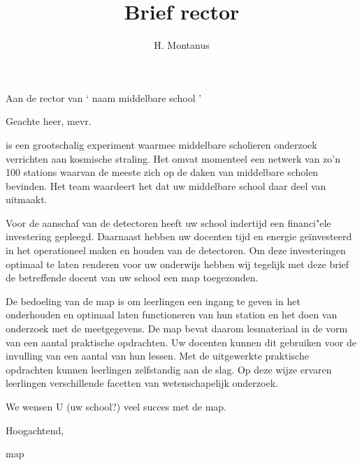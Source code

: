




\title{Brief rector}
\author{H. Montanus}
\date{}

\maketitle
 
Aan de rector van ` naam middelbare school ' 

Geachte heer, mevr. 

\hisparc is een grootschalig experiment waarmee middelbare scholieren
onderzoek verrichten aan kosmische straling. Het omvat momenteel een
netwerk van zo'n 100 stations waarvan de meeste zich op de daken van
middelbare scholen bevinden. Het \hisparc team waardeert het dat uw
middelbare school daar deel van uitmaakt.  

Voor de aanschaf van de detectoren heeft uw school indertijd een financi"ele investering gepleegd. Daarnaast hebben uw docenten tijd en energie ge\"investeerd in het operationeel maken en houden van de detectoren. Om deze investeringen optimaal te laten renderen voor uw onderwijs hebben wij tegelijk met deze brief de betreffende docent van uw school een \hisparc map  toegezonden.

De bedoeling van de \hisparc map is om leerlingen een ingang te geven in het onderhouden en optimaal laten functioneren van hun \hisparc station en het doen van onderzoek met de meetgegevens. De \hisparc map bevat daarom lesmateriaal in de vorm van een aantal praktische opdrachten. Uw docenten kunnen dit gebruiken voor de invulling van een aantal van hun lessen. Met de uitgewerkte praktische opdrachten kunnen leerlingen zelfstandig aan de slag. Op deze wijze ervaren leerlingen verschillende facetten van wetenschapelijk onderzoek. 

We wensen U (uw school?) veel succes met de \hisparc map.
 
Hoogachtend,

\hisparc map
 
 

